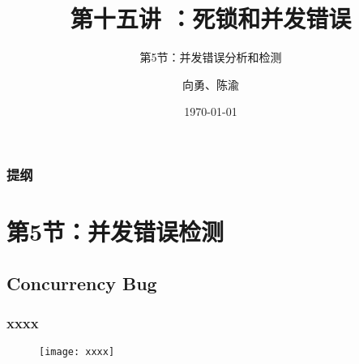 


\title[第15讲]{第十五讲 ：死锁和并发错误} %
\subtitle{第5节：并发错误分析和检测}
\author{向勇、陈渝} %
\date{\today} %




\begin{frame}
\titlepage %
\end{frame}

\begin{frame}
\frametitle{提纲} %
\tableofcontents %
\end{frame}
\section{第5节：并发错误检测} %
\subsection{Concurrency Bug} %
\begin{frame}[fragile]
    \frametitle{xxxx}
    \begin{figure}
    \texttt{[image: xxxx]}
    \end{figure}
\end{frame}
